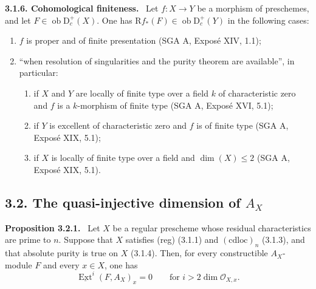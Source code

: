 \documentclass[11pt]{article}
\providecommand{\cO}{\mathcal{O}}
\providecommand{\uExt}{\underline{\Ext}}
\newenvironment{statement}[1]{\par\medskip\noindent\textbf{#1.}\ }{\par\medskip}
\DeclareMathOperator{\Ext}{Ext}
\newcommand{\R}{\mathrm{R}}
\newcommand{\D}{\mathrm{D}}
\newcommand{\ob}{\operatorname{ob}}
\providecommand{\ob}{\operatorname{ob}}
\providecommand{\R}{\mathrm R}
\begin{document}
\begin{statement}{3.1.6. Cohomological finiteness}
Let $f:X\to Y$ be a morphism of preschemes, and let $F\in\ob\D_c^+(X)$. One has $\R f_*(F)\in\ob\D_c^+(Y)$ in the following cases:
\begin{enumerate}[label=\alph*)]
\item $f$ is proper and of finite presentation (SGA A, Exposé XIV, 1.1);
\item ``when resolution of singularities and the purity theorem are available'', in particular:
\begin{enumerate}[label=(\roman*)]
\item if $X$ and $Y$ are locally of finite type over a field $k$ of characteristic zero and $f$ is a $k$-morphism of finite type (SGA A, Exposé XVI, 5.1);
\item if $Y$ is excellent of characteristic zero and $f$ is of finite type (SGA A, Exposé XIX, 5.1);
\item if $X$ is locally of finite type over a field and $\dim(X)\le2$ (SGA A, Exposé XIX, 5.1).
\end{enumerate}
\end{enumerate}
\end{statement}

\subsection*{3.2. The quasi-injective dimension of $A_X$}

\begin{statement}{Proposition 3.2.1}
Let $X$ be a regular prescheme whose residual characteristics are prime to $n$. Suppose that $X$ satisfies (reg) (3.1.1) and $(\mathrm{cdloc})_n$ (3.1.3), and that absolute purity is true on $X$ (3.1.4). Then, for every constructible $A_X$-module $F$ and every $x\in X$, one has
\begin{equation}
\uExt^i(F,A_X)_x=0\qquad\text{for } i>2\dim\cO_{X,x}.\tag{*}
\end{equation}
\end{statement}
\end{document}
